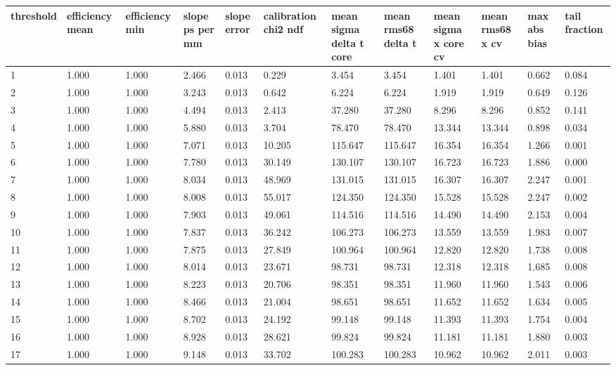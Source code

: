 \begin{tabular}{llllllllllll}
threshold & efficiency mean & efficiency min & slope ps per mm & slope error & calibration chi2 ndf & mean sigma delta t core & mean rms68 delta t & mean sigma x core cv & mean rms68 x cv & max abs bias & tail fraction \\
\hline
1 & 1.000 & 1.000 & 2.466 & 0.013 & 0.229 & 3.454 & 3.454 & 1.401 & 1.401 & 0.662 & 0.084 \\
2 & 1.000 & 1.000 & 3.243 & 0.013 & 0.642 & 6.224 & 6.224 & 1.919 & 1.919 & 0.649 & 0.126 \\
3 & 1.000 & 1.000 & 4.494 & 0.013 & 2.413 & 37.280 & 37.280 & 8.296 & 8.296 & 0.852 & 0.141 \\
4 & 1.000 & 1.000 & 5.880 & 0.013 & 3.704 & 78.470 & 78.470 & 13.344 & 13.344 & 0.898 & 0.034 \\
5 & 1.000 & 1.000 & 7.071 & 0.013 & 10.205 & 115.647 & 115.647 & 16.354 & 16.354 & 1.266 & 0.001 \\
6 & 1.000 & 1.000 & 7.780 & 0.013 & 30.149 & 130.107 & 130.107 & 16.723 & 16.723 & 1.886 & 0.000 \\
7 & 1.000 & 1.000 & 8.034 & 0.013 & 48.969 & 131.015 & 131.015 & 16.307 & 16.307 & 2.247 & 0.001 \\
8 & 1.000 & 1.000 & 8.008 & 0.013 & 55.017 & 124.350 & 124.350 & 15.528 & 15.528 & 2.247 & 0.002 \\
9 & 1.000 & 1.000 & 7.903 & 0.013 & 49.061 & 114.516 & 114.516 & 14.490 & 14.490 & 2.153 & 0.004 \\
10 & 1.000 & 1.000 & 7.837 & 0.013 & 36.242 & 106.273 & 106.273 & 13.559 & 13.559 & 1.983 & 0.007 \\
11 & 1.000 & 1.000 & 7.875 & 0.013 & 27.849 & 100.964 & 100.964 & 12.820 & 12.820 & 1.738 & 0.008 \\
12 & 1.000 & 1.000 & 8.014 & 0.013 & 23.671 & 98.731 & 98.731 & 12.318 & 12.318 & 1.685 & 0.008 \\
13 & 1.000 & 1.000 & 8.223 & 0.013 & 20.706 & 98.351 & 98.351 & 11.960 & 11.960 & 1.543 & 0.006 \\
14 & 1.000 & 1.000 & 8.466 & 0.013 & 21.004 & 98.651 & 98.651 & 11.652 & 11.652 & 1.634 & 0.005 \\
15 & 1.000 & 1.000 & 8.702 & 0.013 & 24.192 & 99.148 & 99.148 & 11.393 & 11.393 & 1.754 & 0.004 \\
16 & 1.000 & 1.000 & 8.928 & 0.013 & 28.621 & 99.824 & 99.824 & 11.181 & 11.181 & 1.880 & 0.003 \\
17 & 1.000 & 1.000 & 9.148 & 0.013 & 33.702 & 100.283 & 100.283 & 10.962 & 10.962 & 2.011 & 0.003 \\

\end{tabular}
